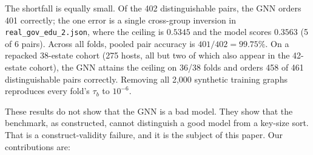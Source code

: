 \documentclass[conference,10pt]{IEEEtran}
\newcommand{\tb}{\tau_b}
\begin{document}
The shortfall is equally small. Of the 402 distinguishable pairs, the GNN orders 401 correctly;
the one error is a single cross-group inversion in \texttt{real\_gov\_edu\_2.json}, where the
ceiling is $0.5345$ and the model scores $0.3563$ (5 of 6 pairs). Across all folds, pooled pair
accuracy is $401/402=99.75\%$. On a repacked 38-estate cohort (275 hosts, all but two of which
also appear in the 42-estate cohort), the GNN attains the ceiling on 36/38 folds and orders 458
of 461 distinguishable pairs correctly. Removing all 2,000 synthetic training graphs reproduces
every fold's $\tb$ to $10^{-6}$.

These results do not show that the GNN is a bad model. They show that the benchmark, as
constructed, cannot distinguish a good model from a key-size sort. That is a construct-validity
failure, and it is the subject of this paper. Our contributions are:
\end{document}
